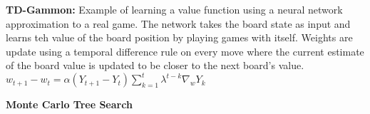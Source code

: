 \textbf{TD-Gammon:} Example of learning a value function using a neural network approximation to a real game. The network takes the board state as input and learns teh value of the board position by playing games with itself. Weights are update using a temporal difference rule on every move where the current estimate of the board value is updated to be closer to the next board's value. $w_{t + 1} - w_t = \alpha(Y_{t + 1} - Y_t) \sum_{k = 1}^t \lambda^{t - k} \nabla_w Y_k$

\textbf{Monte Carlo Tree Search}
